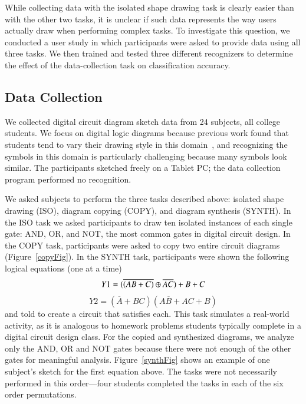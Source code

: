 \documentclass[final,5p,twocolumn]{elsarticle}
\begin{document}
While collecting data with the isolated shape drawing task is clearly
easier than with the other two tasks, it is unclear if such data
represents the way users actually draw when performing complex
tasks. To investigate this question, we conducted a user study in
which participants were asked to provide data using all three tasks.
We then trained and tested three different recognizers to determine
the effect of the data-collection task on classification accuracy.




\subsection{Data Collection}
We collected digital circuit diagram sketch data from 24 subjects, all
college students.  We focus on digital logic diagrams because previous
work found that students tend to vary their drawing style in this
domain~\cite{Alvarado2007Properties}, and recognizing the symbols in
this domain is particularly challenging because many symbols look
similar. The participants sketched freely on a Tablet PC; the data
collection program performed no recognition.

We asked subjects to perform the three tasks described above: isolated
shape drawing (ISO), diagram copying (COPY), and diagram synthesis
(SYNTH).  In the ISO task we asked participants to draw ten isolated
instances of each single gate: AND, OR, and NOT, the most common gates
in digital circuit design.  In the COPY task, participants were asked
to copy two entire circuit diagrams (Figure~\ref{copyFig}).  In the
SYNTH task, participants were shown the following logical equations
(one at a time)
\[
Y1 = (\overline{(AB+C)}\oplus\overline{AC})+B+C \\
\]
\[
Y2 = (\overline{A}+BC)(A\overline{B}+AC+B)
\]
and told to create a circuit that satisfies each.  This task
simulates a real-world activity, as it is analogous to homework
problems students typically complete in a digital circuit design
class.  For the copied and synthesized diagrams, we analyze only the AND,
OR and NOT gates because there were not enough of the other gates for
meaningful analysis.  Figure~\ref{synthFig} shows an example of one subject's
sketch for the first equation above.  The tasks were not necessarily performed in this order---four students completed the tasks in each of the six order permutations.
\end{document}
